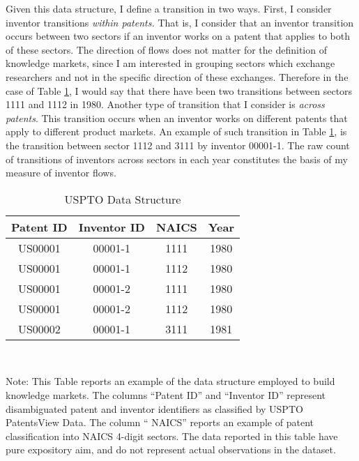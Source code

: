 Given this data structure, I define a transition in two ways. First,
I consider inventor transitions \emph{within patents. }That is, I
consider that an inventor transition occurs between two sectors if
an inventor works on a patent that applies to both of these sectors.
The direction of flows does not matter for the definition of knowledge
markets, since I am interested in grouping sectors which exchange
researchers and not in the specific direction of these exchanges.
Therefore in the case of Table \ref{tab:Data}, I would say that there
have been two transitions between sectors 1111 and 1112 in 1980. Another
type of transition that I consider is \emph{across patents}. This
transition occurs when an inventor works on different patents that
apply to different product markets. An example of such transition
in Table \ref{tab:Data}, is the transition between sector 1112 and
3111 by inventor 00001-1. The raw count of transitions of inventors
across sectors in each year constitutes the basis of my measure of
inventor flows.
\begin{center}
\begin{table}

\begin{centering}
\caption{USPTO Data Structure}
\label{tab:Data}%
\begin{tabular}{|c|c|c|c|}
\hline 
Patent ID & Inventor ID & \citet{goldschlagAlgorithmicLinksProbabilities2016} NAICS & Year\tabularnewline
\hline 
US00001 & 00001-1 & 1111 & 1980\tabularnewline
US00001 & 00001-1 & 1112 & 1980\tabularnewline
US00001 & 00001-2 & 1111 & 1980\tabularnewline
US00001 & 00001-2 & 1112 & 1980\tabularnewline
US00002 & 00001-1 & 3111 & 1981\tabularnewline
\hline 
\end{tabular}\\
\par\end{centering}
{\footnotesize{}Note: This Table reports an example of the data structure
employed to build knowledge markets. The columns ``Patent ID'' and
``Inventor ID'' represent disambiguated patent and inventor identifiers
as classified by USPTO PatentsView Data. The column ``\citet{goldschlagAlgorithmicLinksProbabilities2016}
NAICS'' reports an example of patent classification into NAICS 4-digit
sectors. The data reported in this table have pure expository aim,
and do not represent actual observations in the dataset.}{\footnotesize\par}
\end{table}
\par\end{center}

